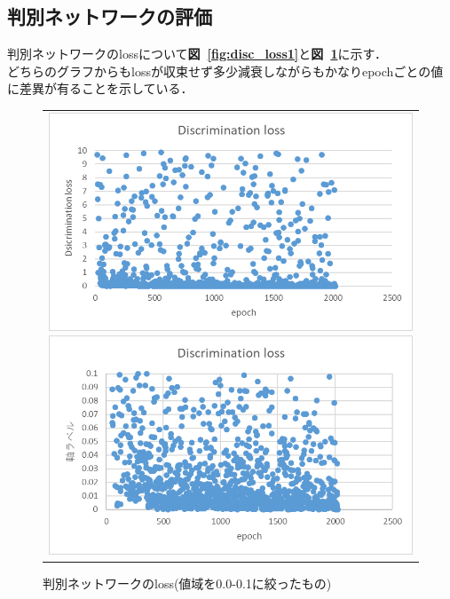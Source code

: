 \documentclass[a4j, 11pt]{jreport}
\newcommand{\figref}[1]{\textbf{図~\ref{#1}}}
\begin{document}
\subsection{判別ネットワークの評価}
判別ネットワークのlossについて\figref{fig:disc_loss1}と\figref{fig:disc_loss2}に示す．\\
どちらのグラフからもlossが収束せず多少減衰しながらもかなりepochごとの値に差異が有ることを示している．\\
\begin{figure}[H]
	\centering
	  \begin{tabular}{c}
		\begin{minipage}{0.50\hsize}
		  \centering
			\includegraphics[scale=0.5]
			{images/result/loss/discrimination_loss1(2).png}
			\caption{判別ネットワークのloss}
			\label{fig:disc_loss1}
		\end{minipage}
   
   
		\begin{minipage}{0.50\hsize}
		  \centering
			\includegraphics[scale=0.5]
							{images/result/loss/discrimination_loss2(2).png}
							\caption{判別ネットワークのloss(値域を0.0-0.1に絞ったもの)}
							\label{fig:disc_loss2}
		\end{minipage} \\
	\end{tabular}
\end{figure}
\end{document}

